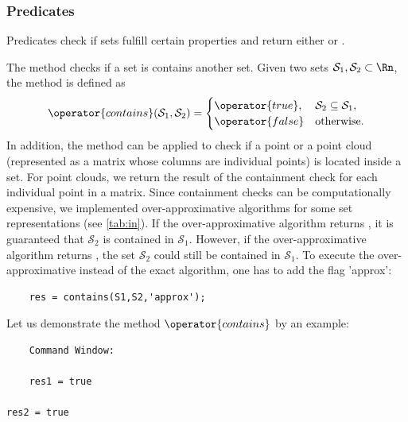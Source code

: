 \subsubsection{Predicates}

Predicates check if sets fulfill certain properties and return either  or .

 \label{sec:contains}

The method  checks if a set is contains another set.
Given two sets $\mathcal{S}_1,\mathcal{S}_2 \subset \Rn$, the method  is defined as
	\begin{equation*}
		\operator{contains}(\mathcal{S}_1,\mathcal{S}_2) = 
		\begin{cases}
			\operator{true}, & \mathcal{S}_2 \subseteq \mathcal{S}_1, \\
			\operator{false} & \mathrm{otherwise}.
		\end{cases}
	\end{equation*}
In addition, the method  can be applied to check if a point or a point cloud (represented as a matrix whose columns are individual points) is located inside a set. For point clouds, we return the result of the containment check for each individual point in a matrix. Since containment checks can be computationally expensive, we implemented over-approximative algorithms for some set representations (see \cref{tab:in}). If the over-approximative algorithm returns , it is guaranteed that $\mathcal{S}_2$ is contained in $\mathcal{S}_1$. However, if the over-approximative algorithm returns , the set $\mathcal{S}_2$ could still be contained in $\mathcal{S}_1$. To execute the over-approximative instead of the exact algorithm, one has to add the flag 'approx':
\begin{verbatim}
	res = contains(S1,S2,'approx');
\end{verbatim}

Let us demonstrate the method $\operator{contains}$ by an example:

\begin{center}
\begin{minipage}[t]{0.40\textwidth}
	\vspace{10pt}
	\footnotesize
	
\end{minipage}
\begin{minipage}[t]{0.2\textwidth}
	\vspace{10pt}

	\begin{verbatim}
	Command Window:	
		
	res1 = true
	
res2 = true
	\end{verbatim}
\end{minipage}
\begin{minipage}[t]{0.3\textwidth}
	\vspace{0pt}
	\centering
\end{minipage}
\end{center}


